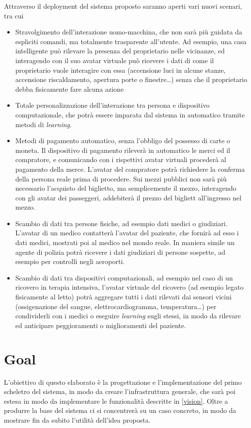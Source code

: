 \documentclass[a4paper,12pt]{report}
\begin{document}
Attraverso il deployment del sistema proposto saranno aperti vari nuovi scenari, tra cui
\begin{itemize}
	\item  Stravolgimento dell'interazione uomo-macchina, che non sarà più guidata da espliciti comandi, ma totalmente trasparente all'utente. Ad esempio, una casa intelligente può rilevare la presenza del proprietario nelle vicinanze, ed interagendo con il suo avatar virtuale può ricevere i dati di come il proprietario vuole interagire con essa (accensione luci in alcune stanze, accensione riscaldamento, apertura porte o finestre\dots) senza che il proprietario debba fisicamente fare alcuna azione
	\item Totale personalizzazione dell'interazione tra persona e dispositivo computazionale, che potrà essere imparata dal sistema in automatico tramite metodi di \emph{learning}.
	\item Metodi di pagamento automatico, senza l'obbligo del possesso di carte o moneta. Il dispositivo di pagamento rileverà in automatico le merci ed il compratore, e comunicando con i rispettivi avatar virtuali procederà al pagamento della merce. L'avatar del compratore potrà richiedere la conferma della persona reale prima di procedere. Sui mezzi pubblici non sarà più necessario l'acquisto del biglietto, ma semplicemente il mezzo, interagendo con gli avatar dei passeggeri, addebiterà il prezzo del bigliett all'ingresso nel mezzo.
	\item Scambio di dati tra persone fisiche, ad esempio dati medici o giudiziari. L'avatar di un medico contatterà l'avatar del paziente, che fornirà ad esso i dati medici, mostrati poi al medico nel mondo reale. In maniera simile un agente di polizia potrà ricevere i dati giudiziari di persone sospette, ad esempio per controlli negli aeroporti. 
	\item Scambio di dati tra dispositivi computazionali, ad esempio nel caso di un ricovero in terapia intensiva, l'avatar virtuale del ricovero (ad esempio legato fisicamente al letto) potrà aggregare tutti i dati rilevati dai sensori vicini (ossigenazione del sangue, elettrocardiogramma, temperatura\dots) per condividerli con i medici o eseguire \emph{learning} sugli stessi, in modo da rilevare ed anticipare peggioramenti o miglioramenti del paziente.
\end{itemize}

\section{Goal}
L'obiettivo di questo elaborato è la progettazione e l'implementazione del primo scheletro del sistema, in modo da creare l'infrastruttura generale, che sarà poi estesa in modo da implementare le funzionalità descritte in \autoref{vision}. Oltre a produrre la base del sistema ci si concentrerà su un caso concreto, in modo da mostrare fin da subito l'utilità dell'idea proposta. 
\end{document}
